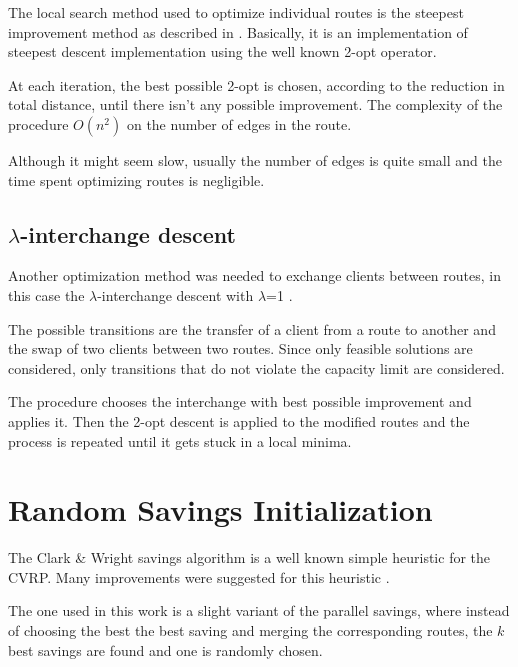 \documentclass{article} %
\begin{document}
The local search method used to optimize individual routes is the steepest improvement method as described in \citep{steepest_improvement}.
Basically, it is an implementation of steepest descent implementation using the well known 2-opt operator.\newline

At each iteration, the best possible 2-opt is chosen, according to the reduction in total distance, until there isn't any possible improvement. The complexity of the procedure $O(n^{2})$ on the number of edges in the route.\newline

Although it might seem slow, usually the number of edges is quite small and the time spent optimizing routes is negligible.\newline



\subsection{$\lambda$-interchange descent}
\label{local_cluster}
Another optimization method was needed to exchange clients between routes, in this case the $\lambda$-interchange descent with $\lambda$=1 \citep{osman1993}.\newline

The possible transitions are the transfer of a client from a route to another and the swap of two clients between two routes. Since only feasible solutions are considered, only transitions that do not violate the capacity limit are considered.\newline

The procedure chooses the interchange with best possible improvement and applies it. Then the 2-opt descent is applied to the modified routes and the process is repeated until it gets stuck in a local minima.


\newpage
\section{Random Savings Initialization}
\label{random_savings}
The Clark \& Wright savings algorithm is a well known simple heuristic for the CVRP.
Many improvements were suggested for this heuristic \cite{clark_wright_ds}.\newline

The one used in this work is a slight variant of the parallel savings, where instead of choosing the best the best saving and merging the corresponding routes, the $k$ best savings are found and one is randomly chosen.\newline
\end{document}
